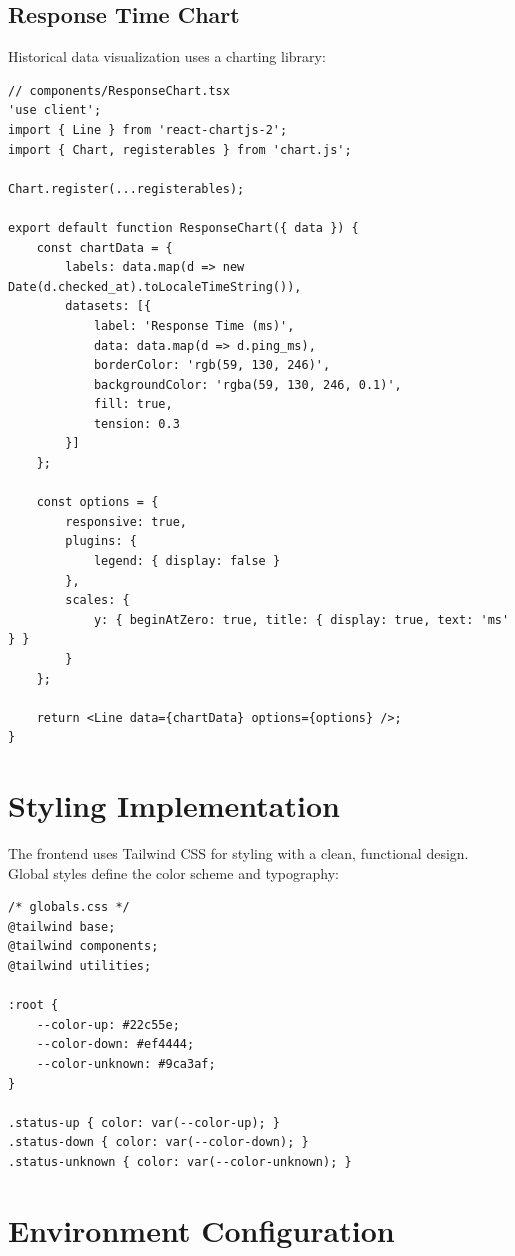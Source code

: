 \subsection{Response Time Chart}

Historical data visualization uses a charting library:

\begin{verbatim}
// components/ResponseChart.tsx
'use client';
import { Line } from 'react-chartjs-2';
import { Chart, registerables } from 'chart.js';

Chart.register(...registerables);

export default function ResponseChart({ data }) {
    const chartData = {
        labels: data.map(d => new Date(d.checked_at).toLocaleTimeString()),
        datasets: [{
            label: 'Response Time (ms)',
            data: data.map(d => d.ping_ms),
            borderColor: 'rgb(59, 130, 246)',
            backgroundColor: 'rgba(59, 130, 246, 0.1)',
            fill: true,
            tension: 0.3
        }]
    };
    
    const options = {
        responsive: true,
        plugins: {
            legend: { display: false }
        },
        scales: {
            y: { beginAtZero: true, title: { display: true, text: 'ms' } }
        }
    };
    
    return <Line data={chartData} options={options} />;
}
\end{verbatim}

\section{Styling Implementation}

The frontend uses Tailwind CSS for styling with a clean, functional design. Global styles define the color scheme and typography:

\begin{verbatim}
/* globals.css */
@tailwind base;
@tailwind components;
@tailwind utilities;

:root {
    --color-up: #22c55e;
    --color-down: #ef4444;
    --color-unknown: #9ca3af;
}

.status-up { color: var(--color-up); }
.status-down { color: var(--color-down); }
.status-unknown { color: var(--color-unknown); }
\end{verbatim}

\section{Environment Configuration}

